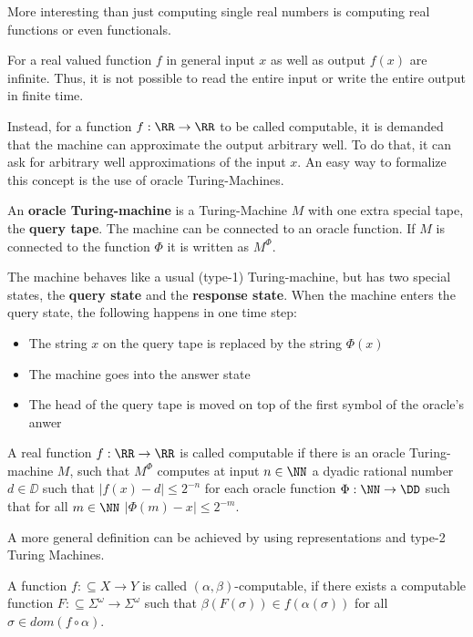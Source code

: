 More interesting than just computing single real numbers is computing real
functions or even functionals.

For a real valued function $f$ in general input $x$ as well as
output $f(x)$ are infinite. 
Thus, it is not possible to read the entire input or write the entire output in
finite time.

Instead, for a function $f: \RR \to \RR$ to be called computable, it is
demanded that the machine can approximate the output arbitrary well.
To do that, it can ask for arbitrary well approximations of the input $x$.
An easy way to formalize this concept is the use of oracle Turing-Machines.
\begin{definition}\label{def:computability_oracle_tm}
 An \textbf{oracle Turing-machine} is a Turing-Machine $M$ with one extra special
 tape, the \textbf{query tape}. The machine can be connected to an oracle
 function.
 If $M$ is connected to the function $\Phi$ it is written as $M^\Phi$. 

 The machine behaves like a usual (type-1) Turing-machine, but has two special
 states, the \textbf{query state} and the \textbf{response state}. 
 When the machine enters the query state, the following happens in one time
 step: 
 \begin{itemize}
    \item The string $x$ on the query tape is replaced by the string $\Phi(x)$
    \item The machine goes into the answer state
    \item The head of the query tape is moved on top of the first symbol of the
      oracle's anwer
  \end{itemize}

 A real function $f: \RR \to \RR$ is called computable if there is an oracle
 Turing-machine $M$, such that $M^\Phi$ computes at input $n \in \NN$ a dyadic rational
 number $d \in \DD$ such that $| f(x) - d | \leq 2^{-n}$ for each oracle function
 $\Phi: \NN \to \DD$ such that for all $m \in \NN$ $|\Phi(m) - x| \leq 2^{-m}$.   
\end{definition}
A more general definition can be achieved by using representations and type-2
Turing Machines.
\begin{definition}\label{def:computability_function_representation}
	A function $f: \subseteq X \to Y$ is called \textbf{$(\alpha, \beta)$}-computable, 
	if there exists a computable function $F:\subseteq \Sigma^\omega \to \Sigma^\omega$ such that 
	$\beta(F(\sigma)) \in f(\alpha(\sigma))$ for all $\sigma \in dom(f \circ \alpha) $.  
\end{definition}

